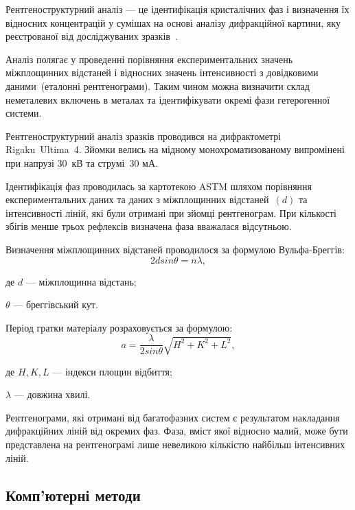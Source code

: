 \documentclass[a4paper,fontsize=14bp,ukrainian]{extreport}
\begin{document}
Рентгеноструктурний аналіз --- це ідентифікація кристалічних фаз і визначення їх відносних концентрацій у сумішах на основі аналізу дифракційної картини, яку реєстрованої від досліджуваних зразків~\cite{horelik1994}.

Аналіз полягає у проведенні порівняння експериментальних значень міжплощинних відстаней і відносних значень інтенсивності з довідковими даними~(еталонні рентгенограми). Таким чином можна визначити склад неметалевих включень в металах та ідентифікувати окремі фази гетерогенної системи.

Рентгеноструктурний аналіз зразків проводився на дифрактометрі Rigaku~Ultima~4. Зйомки велись на мідному монохроматизованому випромінені при напрузі 30~кВ та струмі~30 мА.

Ідентифікація фаз проводилась за картотекою ASTM шляхом порівняння експериментальних даних та даних з міжплощинних відстаней~$(d)$ та інтенсивності ліній, які були отримані при зйомці рентгенограм. При кількості збігів менше трьох рефлексів визначена фаза вважалася відсутньою.

Визначення міжплощинних відстаней проводилося за формулою Вульфа-Бреггів:
\begin{equation}
2d sin\theta=n\lambda,
\label{eq:wulfbregg}
\end{equation}
\begin{eqitemize}
\item[де] $d$ --- міжплощинна відстань;
\item $\theta$ --- бреггівський кут.
\end{eqitemize}

Період гратки матеріалу розраховується за формулою:
\begin{equation}
a = \frac{\lambda}{2sin\theta} \sqrt{H^2+K^2+L^2},
\label{eq:lattice_period}
\end{equation}
\begin{eqitemize}
\item[де] $H, K, L$ --- індекси площин відбиття;
\item $\lambda$ --- довжина хвилі.
\end{eqitemize}

Рентгенограми, які отримані від багатофазних систем є результатом накладання дифракційних ліній від окремих фаз. Фаза, вміст якої відносно малий, може бути представлена на рентгенограмі лише невеликою кількістю найбільш інтенсивних ліній.

\subsection{Комп'ютерні методи}
\label{subsec:label}
\end{document}
